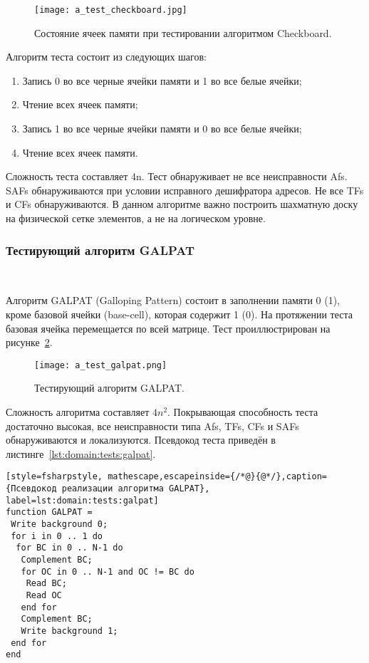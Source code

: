 \begin{figure}[ht]
\centering
  \texttt{[image: a\_test\_checkboard.jpg]}  
  \caption{ Состояние ячеек памяти при тестировании алгоритмом Checkboard. }
  \label{fig:domain:tests:checkboard}
\end{figure}

Алгоритм теста состоит из следующих шагов:
\begin{enumerate}
\item Запись 0 во все черные ячейки памяти и 1 во все белые ячейки;
\item Чтение всех ячеек памяти;
\item Запись 1 во все черные ячейки памяти и 0 во все белые ячейки;
\item Чтение всех ячеек памяти.
\end{enumerate}

Сложность теста составляет 4n. Тест обнаруживает не все неисправности Afs. SAFs обнаруживаются при условии исправного дешифратора адресов. Не все TFs и CFs обнаруживаются. В данном алгоритме важно построить шахматную доску на физической сетке элементов, а не на логическом уровне.

\subsubsection{Тестирующий алгоритм GALPAT}~\\
\label{page:domain:tests:galpat}

Алгоритм GALPAT (Galloping Pattern) состоит в заполнении памяти 0 (1), кроме базовой ячейки (base-cell), которая содержит 1 (0). На протяжении теста базовая ячейка перемещается по всей матрице. Тест проиллюстрирован на рисунке~\ref{fig:domain:tests:galpat}.

\begin{figure}[ht]
\centering
  \texttt{[image: a\_test\_galpat.png]}  
  \caption{ Тестирующий алгоритм GALPAT. }
  \label{fig:domain:tests:galpat}
\end{figure}

Сложность алгоритма составляет $ 4n^{2} $. Покрывающая способность теста достаточно высокая, все неисправности типа Afs, TFs, CFs и SAFs обнаруживаются и локализуются. Псевдокод теста приведён в листинге~\ref{lst:domain:tests:galpat}.

\begin{lstlisting}[style=fsharpstyle, mathescape,escapeinside={/*@}{@*/},caption={Псевдокод реализации алгоритма GALPAT}, label=lst:domain:tests:galpat]
function GALPAT =
 Write background 0;
 for i in 0 .. 1 do
  for BC in 0 .. N-1 do
   Complement BC;
   for OC in 0 .. N-1 and OC != BC do
    Read BC;
    Read OC
   end for
   Complement BC;
   Write background 1;
 end for
end
\end{lstlisting}

